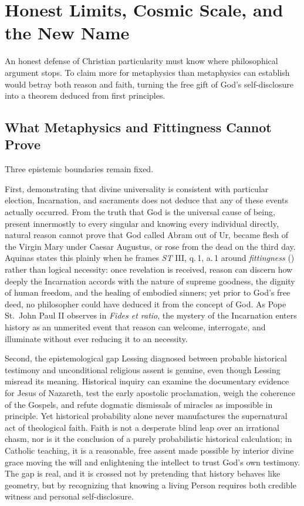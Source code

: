 \section{Honest Limits, Cosmic Scale, and the New Name}

An honest defense of Christian particularity must know where philosophical argument stops. To claim more for metaphysics than metaphysics can establish would betray both reason and faith, turning the free gift of God's self-disclosure into a theorem deduced from first principles.

\subsection{What Metaphysics and Fittingness Cannot Prove}

Three epistemic boundaries remain fixed.

First, demonstrating that divine universality is consistent with particular election, Incarnation, and sacraments does not deduce that any of these events actually occurred. From the truth that God is the universal cause of being, present innermostly to every singular and knowing every individual directly, natural reason cannot prove that God called Abram out of Ur, became flesh of the Virgin Mary under Caesar Augustus, or rose from the dead on the third day. Aquinas states this plainly when he frames \textit{ST} III, q.\,1, a.\,1 around \emph{fittingness} () rather than logical necessity: once revelation is received, reason can discern how deeply the Incarnation accords with the nature of supreme goodness, the dignity of human freedom, and the healing of embodied sinners; yet prior to God's free deed, no philosopher could have deduced it from the concept of God. As Pope St.\ John Paul II observes in \textit{Fides et ratio}, the mystery of the Incarnation enters history as an unmerited event that reason can welcome, interrogate, and illuminate without ever reducing it to an  necessity.

Second, the epistemological gap Lessing diagnosed between probable historical testimony and unconditional religious assent is genuine, even though Lessing misread its meaning. Historical inquiry can examine the documentary evidence for Jesus of Nazareth, test the early apostolic proclamation, weigh the coherence of the Gospels, and refute dogmatic dismissals of miracles as impossible in principle. Yet historical probability alone never manufactures the supernatural act of theological faith. Faith is not a desperate blind leap over an irrational chasm, nor is it the conclusion of a purely probabilistic historical calculation; in Catholic teaching, it is a reasonable, free assent made possible by interior divine grace moving the will and enlightening the intellect to trust God's own testimony. The gap is real, and it is crossed not by pretending that history behaves like geometry, but by recognizing that knowing a living Person requires both credible witness and personal self-disclosure.

